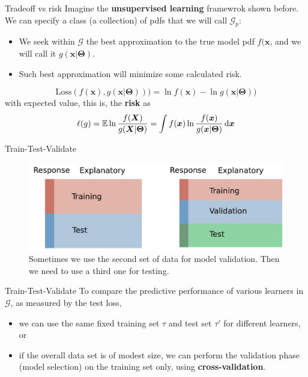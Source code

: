 \documentclass{beamer}
\begin{document}
\begin{frame}{Tradeoff vs risk}
  Imagine the {\bf unsupervised learning} framewrok shown before. We can specify a class (a collection) of pdfs  that we will call $\mathcal{G}_p$:
  \begin{itemize}
    \item We seek within $\mathcal{G}$ the best approximation to the true model pdf $f(\bm{x}$, and we will call it $g(\bm{x}|\bm{\Theta})$. 
    \item Such best approximation will minimize some calculated risk.
  \end{itemize}
  \[
    \mathrm{Loss}(f(\bm{x}),g(\bm{x}|\bm{\Theta})))=\ln f(\bm{x}) - \ln g(\bm{x}|\bm{\Theta}))
    \]
    with expected value, this is, the {\bf risk} as
    \[
    \ell(g)= \mathbb{E}  \ln \frac{f(\bm{X})}{g(\bm{X}|\bm{\Theta})} = \int f(\bm{x}) \ln \frac{f(\bm{x})}{g(\bm{x}|\bm{\Theta})} \mathop{}\!\mathrm{d} \bm{x}
    \]
\end{frame}

\begin{frame}{Train-Test-Validate}
  \begin{figure}
    \includegraphics[width=0.7\linewidth]{traintestvalidate}
    \caption{Sometimes we use the second set of data for model validation. Then we need to use a third one for testing.}
    \label{fig:ttv}
  \end{figure}
\end{frame}

\begin{frame}{Train-Test-Validate}
  To compare the predictive performance of various learners in $\mathcal{G}$, as measured by the test loss,
  \begin{itemize}
    \item  we can use the same fixed training set $\tau$ and test set $\tau'$ for different learners, or
    \item if the overall data set is of modest size, we can perform the validation phase (model selection) on the training set only, using {\bf cross-validation}. 
  \end{itemize}

\end{frame}
\end{document}
